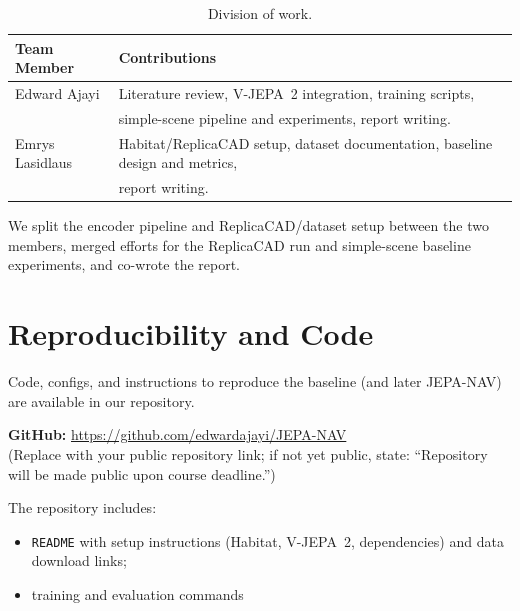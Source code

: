\documentclass{article}
\begin{document}
\begin{table}[htbp]
\centering
\caption{Division of work.}
\label{tab:division}
\begin{tabular}{ll}
\toprule
\textbf{Team Member} & \textbf{Contributions} \\
\midrule
Edward Ajayi
  & Literature review, V-JEPA~2 integration, training scripts, \\
  & simple-scene pipeline and experiments, report writing. \\
Emrys Lasidlaus
  & Habitat/ReplicaCAD setup, dataset documentation, baseline design and metrics, \\
  & report writing. \\
\bottomrule
\end{tabular}
\end{table}

\noindent
We split the encoder pipeline and ReplicaCAD/dataset setup between the two members,
merged efforts for the ReplicaCAD run and simple-scene baseline experiments, and
co-wrote the report.

\section{Reproducibility and Code}

Code, configs, and instructions to reproduce the baseline (and later JEPA-NAV) are
available in our repository.

\smallskip\noindent
\textbf{GitHub:} \url{https://github.com/edwardajayi/JEPA-NAV}\\
(Replace with your public repository link; if not yet public, state: ``Repository will
be made public upon course deadline.'')

\smallskip\noindent
The repository includes:
\begin{itemize}
  \item \texttt{README} with setup instructions (Habitat, V-JEPA~2, dependencies) and
        data download links;
  \item training and evaluation commands
\end{itemize}



\end{document}
